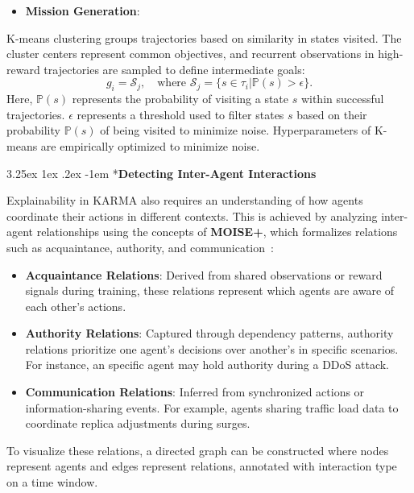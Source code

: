 \documentclass[conference]{IEEEtran}
\makeatletter
\renewcommand\paragraph{\@startsection{paragraph}{5}{\z@}%
  {3.25ex \@plus1ex \@minus.2ex}%
  {-1em}%
  {\normalfont\normalsize\bfseries}}
\makeatother
\begin{document}
\begin{itemize}
    \item \textbf{Mission Generation}:
\end{itemize}    

\noindent K-means clustering groups trajectories based on similarity in states visited. The cluster centers represent common objectives, and recurrent observations in high-reward trajectories are sampled to define intermediate goals:
    \[
    g_i = \mathcal{S}_j, \quad \text{where } \mathcal{S}_j = \{s \in \tau_i | \mathbb{P}(s) > \epsilon\}.
    \]
    Here, $\mathbb{P}(s)$ represents the probability of visiting a state $s$ within successful trajectories. $\epsilon$ represents a threshold used to filter states $s$ based on their probability $\mathbb{P}(s)$ of being visited to minimize noise. Hyperparameters of K-means are empirically optimized to minimize noise.


\paragraph*{\textbf{Detecting Inter-Agent Interactions}}

Explainability in KARMA also requires an understanding of how agents coordinate their actions in different contexts. This is achieved by analyzing inter-agent relationships using the concepts of \textbf{MOISE+}, which formalizes relations such as acquaintance, authority, and communication~\cite{hubner2002moise}:
\begin{itemize}
    \item \textbf{Acquaintance Relations}: Derived from shared observations or reward signals during training, these relations represent which agents are aware of each other's actions.
    \item \textbf{Authority Relations}: Captured through dependency patterns, authority relations prioritize one agent's decisions over another's in specific scenarios. For instance, an specific agent may hold authority during a DDoS attack.
    \item \textbf{Communication Relations}: Inferred from synchronized actions or information-sharing events. For example, agents sharing traffic load data to coordinate replica adjustments during surges.
\end{itemize}

To visualize these relations, a directed graph can be constructed where nodes represent agents and edges represent relations, annotated with interaction type on a time window.
\end{document}
